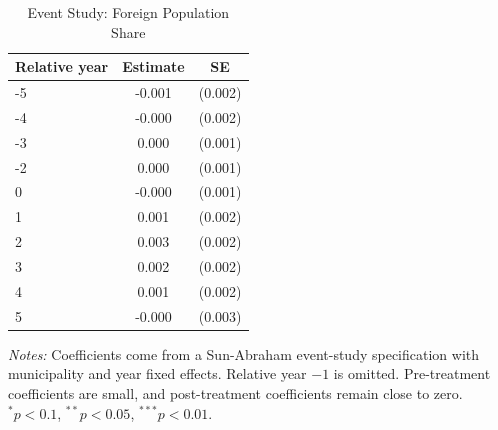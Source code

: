 \begin{table}[htbp]\centering
\caption{Event Study: Foreign Population Share}
\begin{tabular}{lcc}
\toprule
Relative year & Estimate & SE \\
\midrule
-5 & -0.001 & (0.002) \\
-4 & -0.000 & (0.002) \\
-3 & 0.000 & (0.001) \\
-2 & 0.000 & (0.001) \\
0 & -0.000 & (0.001) \\
1 & 0.001 & (0.002) \\
2 & 0.003 & (0.002) \\
3 & 0.002 & (0.002) \\
4 & 0.001 & (0.002) \\
5 & -0.000 & (0.003) \\
\bottomrule
\end{tabular}
\parbox{0.95\textwidth}{\footnotesize \textit{Notes:} Coefficients come from a Sun-Abraham event-study specification with municipality and year fixed effects. Relative year $-1$ is omitted. Pre-treatment coefficients are small, and post-treatment coefficients remain close to zero. $^{*}p<0.1$, $^{**}p<0.05$, $^{***}p<0.01$.}
\end{table}
